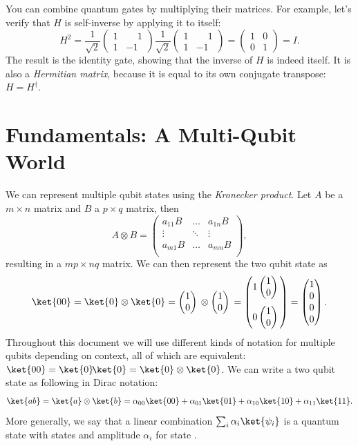 \documentclass[11pt, notitlepage]{report}
\newcommand{\igate}{
  \begin{pmatrix}
  1 & 0 \\
  0 & 1
  \end{pmatrix}
}
\newcommand{\hgate}{
  \dfrac{1}{\sqrt2}
  \begin{pmatrix}
  1 & \phantom{-}1 \\
  1 & -1
  \end{pmatrix}
}
\newcommand{\qstatezero}{
  \begin{pmatrix}1 \\ 0\end{pmatrix}
}
\begin{document}
You can combine quantum gates by multiplying their matrices. For example, let's verify that $H$ is self-inverse by applying it to itself:
\begin{equation}
  H^2 = \hgate{} \hgate{} = \igate{} = I.
\end{equation}
The result is the identity gate, showing that the inverse of $H$ is indeed itself. It is also a \emph{Hermitian matrix}, because it is equal to its own conjugate transpose: $H = H^\dagger$.

\newpage

\chapter{Fundamentals: A Multi-Qubit World}
We can represent multiple qubit states using the \emph{Kronecker product}. Let $A$ be a $m \times n$ matrix and $B$ a $p \times q$ matrix, then
\begin{equation}
  A \otimes B =
    \begin{pmatrix}
      a_{11}B & \dots & a_{1n}B \\
      \vdots & \ddots & \vdots \\
      a_{m1}B & \dots & a_{mn}B \\
    \end{pmatrix},
\end{equation}
resulting in a $mp \times nq$ matrix. We can then represent the two qubit state  as
\begin{equation}
  \ket{00} = \ket{0} \otimes \ket{0} = \qstatezero{} \otimes \qstatezero{} =
  \begin{pmatrix}
    1\qstatezero{} \\[13pt]
    0\qstatezero{}
  \end{pmatrix}
  =
  \begin{pmatrix}
    1 \\
    0 \\
    0 \\
    0
  \end{pmatrix}.
\end{equation}
Throughout this document we will use different kinds of notation for multiple qubits depending on context, all of which are equivalent: $\ket{00} = \ket{0}\!\ket{0} = \ket{0} \otimes \ket{0}$.
We can write a two qubit state as following in Dirac notation:
\begin{equation}
  \ket{ab} = \ket{a} \otimes \ket{b} = \alpha_{00}\ket{00} + \alpha_{01}\ket{01} + \alpha_{10}\ket{10} + \alpha_{11}\ket{11}.
\end{equation}
More generally, we say that a linear combination $\sum_{i} \alpha_i\ket{\psi_i}$ is a quantum state with states  and amplitude $\alpha_i$ for state .
\end{document}
